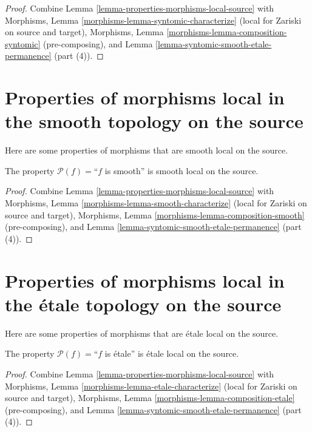 \begin{proof}
Combine Lemma \ref{lemma-properties-morphisms-local-source} with
Morphisms, Lemma \ref{morphisms-lemma-syntomic-characterize}
(local for Zariski on source and target),
Morphisms, Lemma \ref{morphisms-lemma-composition-syntomic} (pre-composing),
and Lemma \ref{lemma-syntomic-smooth-etale-permanence} (part (4)).
\end{proof}




\section{Properties of morphisms local in the smooth topology on the source}
\label{section-smooth-local-source}

\noindent
Here are some properties of morphisms that are smooth local on the source.

\begin{lemma}
\label{lemma-smooth-smooth-local-source}
The property $\mathcal{P}(f)=$``$f$ is smooth''
is smooth local on the source.
\end{lemma}

\begin{proof}
Combine Lemma \ref{lemma-properties-morphisms-local-source} with
Morphisms, Lemma \ref{morphisms-lemma-smooth-characterize}
(local for Zariski on source and target),
Morphisms, Lemma \ref{morphisms-lemma-composition-smooth} (pre-composing), and
Lemma \ref{lemma-syntomic-smooth-etale-permanence} (part (4)).
\end{proof}



\section{Properties of morphisms local in the \'etale topology on the source}
\label{section-etale-local-source}

\noindent
Here are some properties of morphisms that are \'etale local on the source.

\begin{lemma}
\label{lemma-etale-etale-local-source}
The property $\mathcal{P}(f)=$``$f$ is \'etale''
is \'etale local on the source.
\end{lemma}

\begin{proof}
Combine Lemma \ref{lemma-properties-morphisms-local-source} with
Morphisms, Lemma \ref{morphisms-lemma-etale-characterize}
(local for Zariski on source and target),
Morphisms, Lemma \ref{morphisms-lemma-composition-etale} (pre-composing), and
Lemma \ref{lemma-syntomic-smooth-etale-permanence} (part (4)).
\end{proof}

